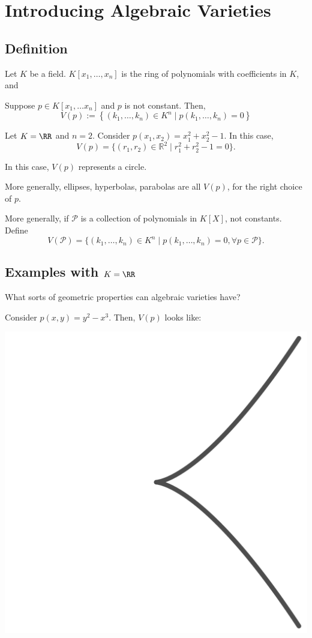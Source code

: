 \newpage
\section{Introducing Algebraic Varieties}

\subsection{Definition}

\begin{defn}
	Let $K$ be a field. $K[x_1, \dots, x_n]$ is the ring of polynomials with coefficients in $K$, and 

	Suppose $p \in K[x_1, \dots x_n]$ and $p$ is not constant. Then, \[
		V(p) := \left\{(k_1, \dots, k_n) \in K^n \mid p(k_1, \dots, k_n) = 0 \right\}
	\] 
\end{defn}

\begin{exmp}
	Let $K = \RR$ and $n = 2$. Consider $p(x_1, x_2) = x_1^2 + x_2^2 - 1$. In this case, \[
		V(p) = \{(r_1, r_2) \in \mathbb{R}^2 \mid r_1^2 + r_2^2 - 1 = 0\}.
	\]

	In this case, $V(p)$ represents a circle.

	More generally, ellipses, hyperbolas, parabolas are all $V(p)$, for the right choice of $p$.
\end{exmp}

\begin{defn}
	More generally, if $\mathcal{P}$ is a collection of polynomials in $K[X]$, not constants. Define \[
		V(\mathcal{P}) = \{(k_1, \dots, k_n) \in K^n \mid p(k_1, \dots, k_n) = 0, \forall p \in \mathcal{P}\}.
	\] 
\end{defn}

\subsection[Examples in real numbers]{Examples with $K = \RR$}

\begin{ques}
	What sorts of geometric properties can algebraic varieties have?
\end{ques}

\begin{exmp}
	Consider $p(x, y) = y^2 - x^3$.  Then, $V(p)$ looks like:
	\begin{center}
		\includegraphics[width = .25\textwidth]{figures/variety_example_1.pdf}
	\end{center}
\end{exmp}

